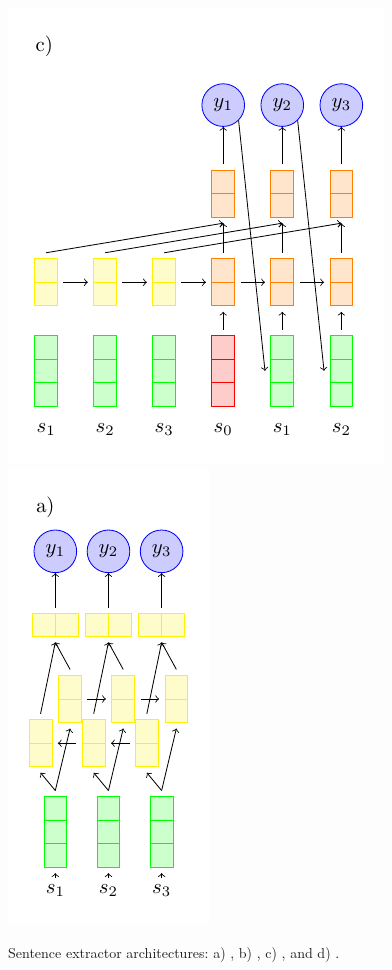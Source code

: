 \begin{figure}
  \includegraphics[scale=.7]{figures/clextractor.pdf}
  \includegraphics[scale=.7]{figures/rnnextractor.pdf}
  \caption{Sentence extractor architectures: a) \modelOneBF, b) \modelTwoBF,
            c) \baselineOneBF, and d) \baselineTwoBF. }
  \label{fig:extractors}
\end{figure}

